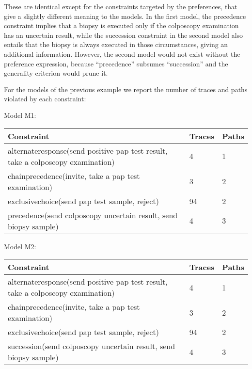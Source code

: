 

These are identical except for the constraints targeted by the preferences, that give a slightly different meaning to the models. In the first model, the precedence constraint implies that a biopsy is executed only if the colposcopy examination has an uncertain result, while the succession constraint in the second model also entails that the biopsy is always executed in those circumstances, giving an additional information.
However, the second model would not exist without the preference expression, because “precedence” subsumes “succession” and the generality criterion would prune it.

For the models of the previous example we report the number of traces and paths violated by each constraint:

Model M1:\\

\begin{tabular}{|l|l|l|}
\hline
Constraint & Traces & Paths \\
\hline
alternateresponse(send positive pap test result, take a colposcopy examination) & 4 & 1\\
\hline
chainprecedence(invite, take a pap test examination) & 3 & 2\\
\hline
exclusivechoice(send pap test sample, reject) & 94 & 2 \\
\hline
precedence(send colposcopy uncertain result, send biopsy sample) & 4 & 3 \\
\hline
\end{tabular}

Model M2:\\

\begin{tabular}{|l|l|l|}
\hline
Constraint & Traces & Paths \\
\hline
alternateresponse(send positive pap test result, take a colposcopy examination) & 4 & 1\\
\hline
chainprecedence(invite, take a pap test examination) & 3 & 2 \\
\hline
exclusivechoice(send pap test sample, reject) & 94 & 2 \\
\hline
succession(send colposcopy uncertain result, send biopsy sample) & 4 & 3\\
\hline
\end{tabular}


